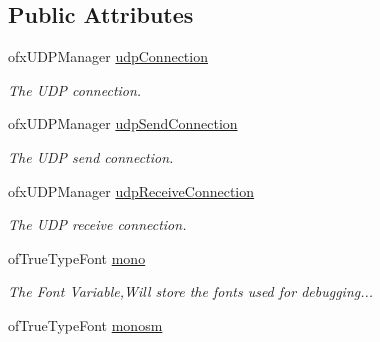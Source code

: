 \subsection*{Public Attributes}
\begin{DoxyCompactItemize}
\item 
\hypertarget{classtest_app_a30c39505591fda7ed8ef4d8c4f0128fd}{ofx\-U\-D\-P\-Manager \hyperlink{classtest_app_a30c39505591fda7ed8ef4d8c4f0128fd}{udp\-Connection}}\label{classtest_app_a30c39505591fda7ed8ef4d8c4f0128fd}

\begin{DoxyCompactList}\small\item\em The U\-D\-P connection. \end{DoxyCompactList}\item 
\hypertarget{classtest_app_a35f96e427475843d44539f125ca454cd}{ofx\-U\-D\-P\-Manager \hyperlink{classtest_app_a35f96e427475843d44539f125ca454cd}{udp\-Send\-Connection}}\label{classtest_app_a35f96e427475843d44539f125ca454cd}

\begin{DoxyCompactList}\small\item\em The U\-D\-P send connection. \end{DoxyCompactList}\item 
\hypertarget{classtest_app_a630d5b8b53aee0c07dc79db616f4eb48}{ofx\-U\-D\-P\-Manager \hyperlink{classtest_app_a630d5b8b53aee0c07dc79db616f4eb48}{udp\-Receive\-Connection}}\label{classtest_app_a630d5b8b53aee0c07dc79db616f4eb48}

\begin{DoxyCompactList}\small\item\em The U\-D\-P receive connection. \end{DoxyCompactList}\item 
\hypertarget{classtest_app_a9bcefa3afb830941451f72174a36b722}{of\-True\-Type\-Font \hyperlink{classtest_app_a9bcefa3afb830941451f72174a36b722}{mono}}\label{classtest_app_a9bcefa3afb830941451f72174a36b722}

\begin{DoxyCompactList}\small\item\em The Font Variable,Will store the fonts used for debugging... \end{DoxyCompactList}\item 
\hypertarget{classtest_app_afc42ad25d37b1292d27d783380249424}{of\-True\-Type\-Font \hyperlink{classtest_app_afc42ad25d37b1292d27d783380249424}{monosm}}\label{classtest_app_afc42ad25d37b1292d27d783380249424}


\end{DoxyCompactItemize}
